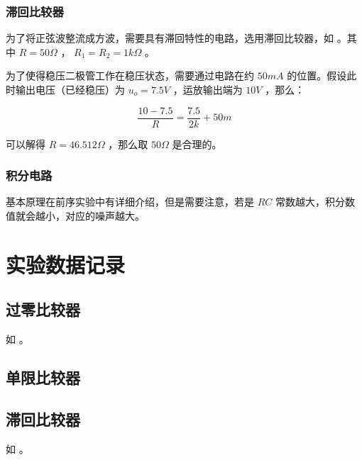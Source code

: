 \documentclass[lang=cn,11pt,a4paper,cite=authoryear]{elegantpaper}
\begin{document}

\subsubsection{滞回比较器}

为了将正弦波整流成方波，需要具有滞回特性的电路，选用滞回比较器，如  。其中 \(R = 50 \Omega\) ， \(R_1 = R_2 = 1 k\Omega\) 。

为了使得稳压二极管工作在稳压状态，需要通过电路在约 \(50 mA\) 的位置。假设此时输出电压（已经稳压）为 \(u_o = 7.5 V\) ，运放输出端为 \(10 V\) ，那么：

\[\frac{10 - 7.5}{R} = \frac{7.5}{2 k} + 50 m\]

可以解得 \(R = 46.512 \Omega\) ，那么取 \(50 \Omega\) 是合理的。


\subsubsection{积分电路} 

基本原理在前序实验中有详细介绍，但是需要注意，若是 \(R C\) 常数越大，积分数值就会越小，对应的噪声越大。

\section{实验数据记录}

\subsection{过零比较器}

如  。


\subsection{单限比较器}


\subsection{滞回比较器}

如  。

\end{document}
